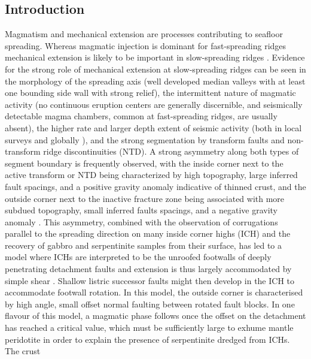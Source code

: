 \documentclass[jgr]{aguplus}
\newlength{\tw}
\begin{document}
\begin{article}

\section{Introduction}

Magmatism and mechanical extension are
 processes contributing to  seafloor spreading.  Whereas magmatic injection is dominant for
fast-spreading ridges mechanical extension is likely to be important
in slow-spreading ridges  \citep{mutter92}.  Evidence for the strong
role of mechanical extension at slow-spreading ridges can be seen in the morphology of the
spreading axis (well developed median valleys with at least one
bounding side wall with strong relief), the intermittent nature of
magmatic activity (no continuous eruption centers are generally
discernible, and seismically detectable magma chambers, common at
fast-spreading ridges, are usually absent), the higher rate and larger
depth extent of seismic activity (both in local surveys
\citep[e.g.,][]{toomey88} and globally \citep{huang88,rundquist02}),
and the strong segmentation by transform faults and non-transform
ridge discontinuities (NTD). A strong asymmetry along both types of
segment boundary is frequently observed, with the inside corner next
to the active transform or NTD being
characterized  by high topography, large inferred fault spacings, and a positive gravity anomaly
indicative of thinned crust, and the outside corner next to the
inactive fracture zone being associated with more subdued topography,
small inferred faults spacings,
and a negative gravity anomaly \citep{shaw93,escartin95}. This asymmetry,
combined with the observation of corrugations parallel to the
spreading direction on many inside corner highs (ICH) and the
recovery of gabbro and serpentinite samples from their surface, has
led to a model where ICHs are interpreted to be the unroofed footwalls
of  deeply penetrating detachment faults and  extension
is thus largely accommodated by simple shear
\citep{tucholke94}. Shallow listric successor faults might then
develop in the ICH to accommodate footwall rotation.  In this model, the outside
corner is characterised by high angle, small offset normal faulting
between rotated fault blocks. In one flavour of this model, a magmatic
phase follows once the offset on the detachment has reached a critical
value, which must be sufficiently large to exhume mantle peridotite in
order to explain the presence of serpentinite dredged from ICHs. The crust

\end{article}
\end{document}
